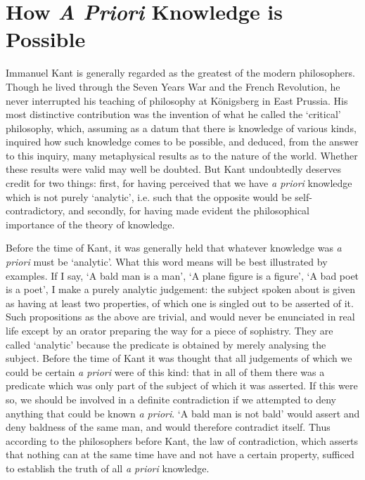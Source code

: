 \documentclass[oneside,letterpaper,12pt]{book}
\begin{document}
\hypertarget{chapter-viii.-how-a-priori-knowledge-is-possible}{%
\chapter{How \emph{A Priori} Knowledge is Possible}}\label{chapter-viii.-how-a-priori-knowledge-is-possible}

Immanuel Kant is generally regarded as the greatest of the modern
philosophers. Though he lived through the Seven Years War and the French
Revolution, he never interrupted his teaching of philosophy at
Königsberg in East Prussia. His most distinctive contribution was the
invention of what he called the
`critical' philosophy, which, assuming
as a datum that there is knowledge of various kinds, inquired how such
knowledge comes to be possible, and deduced, from the answer to this
inquiry, many metaphysical results as to the nature of the world.
Whether these results were valid may well be doubted. But Kant
undoubtedly deserves credit for two things: first, for having perceived
that we have \emph{a priori} knowledge which is not purely
`analytic', i.e. such that the opposite
would be self-contradictory, and secondly, for having made evident the
philosophical importance of the theory of knowledge.

Before the time of Kant, it was generally held that whatever knowledge
was \emph{a priori} must be `analytic'. \label{analytic}
What this word means will be best illustrated by examples. If I say,
`A bald man is a man', `A
plane figure is a figure', `A bad poet is
a poet', I make a purely analytic judgement: the subject
spoken about is given as having at least two properties, of which one is
singled out to be asserted of it. Such propositions as the above are
trivial, and would never be enunciated in real life except by an orator
preparing the way for a piece of sophistry. They are called
`analytic' because the predicate is
obtained by merely analysing the subject. Before the time of Kant it was
thought that all judgements of which we could be certain \emph{a priori}
were of this kind: that in all of them there was a predicate which was
only part of the subject of which it was asserted. If this were so, we
should be involved in a definite contradiction if we attempted to deny
anything that could be known \emph{a priori}. `A bald
man is not bald' would assert and deny baldness of the
same man, and would therefore contradict itself. Thus according to the
philosophers before Kant, the law of contradiction, which asserts that
nothing can at the same time have and not have a certain property,
sufficed to establish the truth of all \emph{a priori} knowledge.
\end{document}
